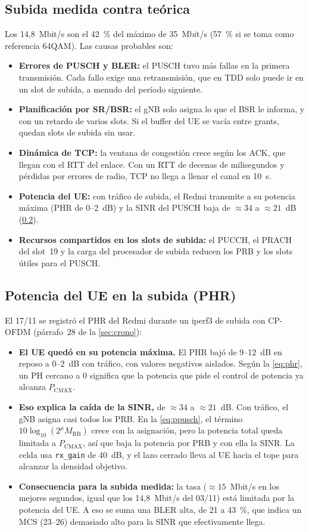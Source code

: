\subsection{Subida medida contra teórica}
Los 14,8~Mbit/s son el 42~\% del máximo de 35~Mbit/s (57~\% si se toma como referencia 64QAM). Las causas probables son:
\begin{itemize}
  \item \textbf{Errores de PUSCH y BLER:} el PUSCH tuvo más fallas en la primera transmisión. Cada fallo exige una retransmisión, que en TDD solo puede ir en un slot de subida, a menudo del período siguiente.
  \item \textbf{Planificación por SR/BSR:} el gNB solo asigna lo que el BSR le informa, y con un retardo de varios slots. Si el buffer del UE se vacía entre grants, quedan slots de subida sin usar.
  \item \textbf{Dinámica de TCP:} la ventana de congestión crece según los ACK, que llegan con el RTT del enlace. Con un RTT de decenas de milisegundos y pérdidas por errores de radio, TCP no llega a llenar el canal en 10~s.
  \item \textbf{Potencia del UE:} con tráfico de subida, el Redmi transmite a su potencia máxima (PHR de 0--2~dB) y la SINR del PUSCH baja de $\approx 34$ a $\approx 21$~dB (\cref{sec:phr_medido}).
  \item \textbf{Recursos compartidos en los slots de subida:} el PUCCH, el PRACH del slot~19 y la carga del procesador de subida reducen los PRB y los slots útiles para el PUSCH.
\end{itemize}

\subsection{Potencia del UE en la subida (PHR)}\label{sec:phr_medido}
El 17/11 se registró el PHR del Redmi durante un iperf3 de subida con CP-OFDM (párrafo~28 de la \cref{sec:crono}):
\begin{itemize}
  \item \textbf{El UE quedó en su potencia máxima.} El PHR bajó de 9--12~dB en reposo a 0--2~dB con tráfico, con valores negativos aislados. Según la \cref{eq:phr}, un PH cercano a 0 significa que la potencia que pide el control de potencia ya alcanza $P_\text{CMAX}$.
  \item \textbf{Eso explica la caída de la SINR,} de $\approx 34$ a $\approx 21$~dB. Con tráfico, el gNB asigna casi todos los PRB. En la \cref{eq:ppusch}, el término $10\log_{10}(2^\mu M_\text{RB})$ crece con la asignación, pero la potencia total queda limitada a $P_\text{CMAX}$, así que baja la potencia por PRB y con ella la SINR. La celda usa \texttt{rx\_gain} de 40~dB, y el lazo cerrado lleva al UE hacia el tope para alcanzar la densidad objetivo.
  \item \textbf{Consecuencia para la subida medida:} la tasa ($\approx 15$~Mbit/s en los mejores segundos, igual que los 14,8~Mbit/s del 03/11) está limitada por la potencia del UE. A eso se suma una BLER alta, de 21 a 43~\%, que indica un MCS (23--26) demasiado alto para la SINR que efectivamente llega.
\end{itemize}

